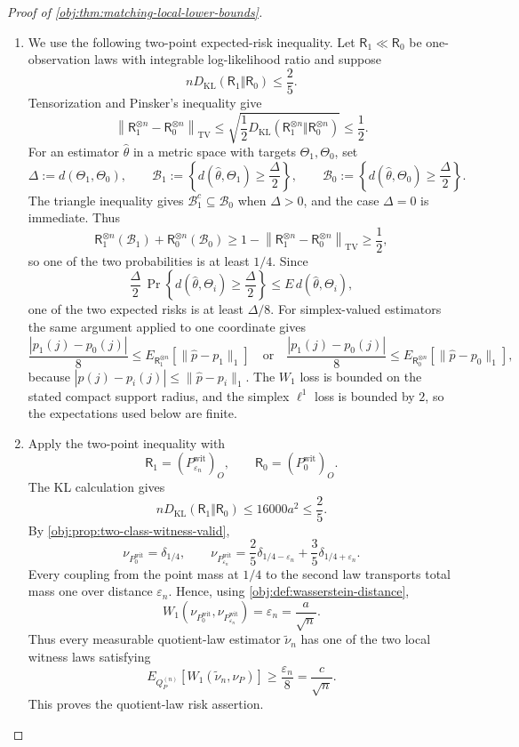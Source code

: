 \documentclass[11pt]{article}
\begin{document}
\begin{proof}[Proof of \cref{obj:thm:matching-local-lower-bounds}]
\begin{enumerate}
\item We use the following two-point expected-risk inequality.  Let \(\mathsf R_1\ll\mathsf R_0\) be one-observation laws with integrable log-likelihood ratio and suppose
\[
nD_{\mathrm{KL}}(\mathsf R_1\Vert\mathsf R_0)\le\frac25 .
\]
Tensorization and Pinsker's inequality give
\[
\left\|\mathsf R_1^{\otimes n}-\mathsf R_0^{\otimes n}\right\|_{\mathrm{TV}}
\le
\sqrt{\frac12D_{\mathrm{KL}}(\mathsf R_1^{\otimes n}\Vert\mathsf R_0^{\otimes n})}
\le\frac12 .
\]
For an estimator \(\widehat\theta\) in a metric space with targets \(\Theta_1,\Theta_0\), set
\[
\Delta:=d(\Theta_1,\Theta_0),
\qquad
\mathcal B_1:=\left\{d(\widehat\theta,\Theta_1)\ge\frac{\Delta}{2}\right\},
\qquad
\mathcal B_0:=\left\{d(\widehat\theta,\Theta_0)\ge\frac{\Delta}{2}\right\}.
\]
The triangle inequality gives \(\mathcal B_1^{c}\subseteq\mathcal B_0\) when \(\Delta>0\), and the case \(\Delta=0\) is immediate.  Thus
\[
\mathsf R_1^{\otimes n}(\mathcal B_1)+\mathsf R_0^{\otimes n}(\mathcal B_0)
\ge
1-\left\|\mathsf R_1^{\otimes n}-\mathsf R_0^{\otimes n}\right\|_{\mathrm{TV}}
\ge\frac12,
\]
so one of the two probabilities is at least \(1/4\).  Since
\[
\frac{\Delta}{2}\,\Pr\!\left\{d(\widehat\theta,\Theta_i)\ge\frac{\Delta}{2}\right\}
\le
E\,d(\widehat\theta,\Theta_i),
\]
one of the two expected risks is at least \(\Delta/8\).  For simplex-valued estimators the same argument applied to one coordinate gives
\[
\frac{|p_1(j)-p_0(j)|}{8}
\le
E_{\mathsf R_1^{\otimes n}}\!\left[\|\widehat p-p_1\|_1\right]
\quad\text{or}\quad
\frac{|p_1(j)-p_0(j)|}{8}
\le
E_{\mathsf R_0^{\otimes n}}\!\left[\|\widehat p-p_0\|_1\right],
\]
because \(|\widehat p(j)-p_i(j)|\le\|\widehat p-p_i\|_1\).  The \(W_1\) loss is bounded on the stated compact support radius, and the simplex \(\ell^1\) loss is bounded by \(2\), so the expectations used below are finite. %

\item Apply the two-point inequality with
\[
\mathsf R_1=(P_{\varepsilon_n}^{\mathrm{wit}})_O,
\qquad
\mathsf R_0=(P_0^{\mathrm{wit}})_O .
\]
The KL calculation gives
\[
nD_{\mathrm{KL}}(\mathsf R_1\Vert\mathsf R_0)
\le
16000a^2
\le
\frac25 .
\]
By \cref{obj:prop:two-class-witness-valid},
\[
\nu_{P_0^{\mathrm{wit}}}=\delta_{1/4},
\qquad
\nu_{P_{\varepsilon_n}^{\mathrm{wit}}}
=
\frac25\delta_{1/4-\varepsilon_n}
+
\frac35\delta_{1/4+\varepsilon_n}.
\]
Every coupling from the point mass at \(1/4\) to the second law transports total mass one over distance \(\varepsilon_n\).  Hence, using \cref{obj:def:wasserstein-distance},
\[
W_1\!\left(\nu_{P_0^{\mathrm{wit}}},\nu_{P_{\varepsilon_n}^{\mathrm{wit}}}\right)
=
\varepsilon_n
=
\frac a{\sqrt n}.
\]
Thus every measurable quotient-law estimator \(\widetilde\nu_n\) has one of the two local witness laws satisfying
\[
E_{Q_P^{(n)}}\!\left[W_1(\widetilde\nu_n,\nu_P)\right]
\ge
\frac{\varepsilon_n}{8}
=
\frac{c}{\sqrt n}.
\]
This proves the quotient-law risk assertion. %


\end{enumerate}
\end{proof}
\end{document}

